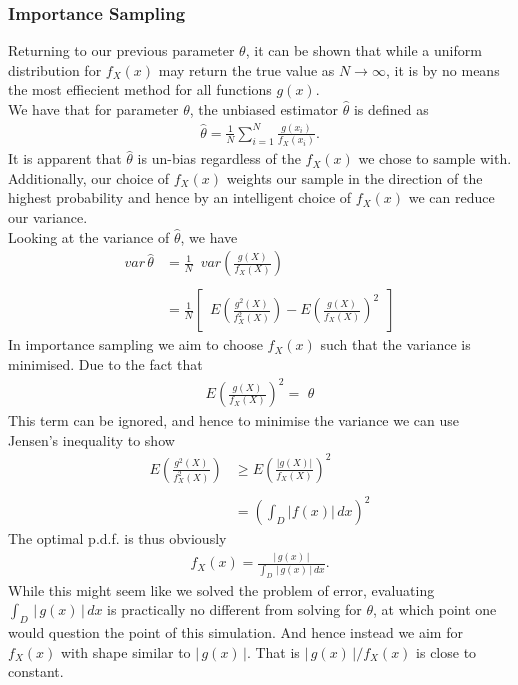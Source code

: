 \documentclass{article}
\begin{document}
\subsubsection{Importance Sampling}
Returning to our previous parameter $\theta$, it can be shown that while a uniform distribution for $f_{X}(x)$ may return the true value as $N\to \infty$, it is by no means the most effiecient method for all functions $g(x)$.
\\
We have that for parameter $\theta$, the unbiased estimator $\hat{\theta}$ is defined as 
\begin{align}
\hat{\theta}=\frac{1}{N}\sum_{i=1}^{N} \frac{g(x_{i})}{f_{X}(x_{i})}.
\end{align}
It is apparent that $\hat{\theta}$ is un-bias regardless of the $f_{X}(x)$ we chose to sample with. Additionally, our choice of $f_{X}(x)$ weights our sample in the direction of the highest probability and hence by an intelligent choice of $f_{X}(x)$ we can reduce our variance. 
\\
Looking at the variance of $\hat{\theta}$, we have
\begin{align}
var\,\hat{\theta} &= \frac{1}{N} \,\,\, var\left( \frac{g(X)}{f_{X}(X)} \right)\\
\\
&=\frac{1}{N} \left[ \,\,\, E \left( \frac{g^{2}(X)}{f_{X}^{2}(X)} \right) - E\left( \frac{g(X)}{f_{X}(X)} \right)^{2} \,\,\, \right]
\end{align}
In importance sampling we aim to choose $f_{X}(x)$ such that the variance is minimised.
Due to the fact that 
\begin{align}
E\left( \frac{g(X)}{f_{X}(X)} \right)^{2}  = \,\, \theta
\end{align}
This term can be ignored, and hence to minimise the variance we can use Jensen's inequality to show 
\begin{align}
E\left( \frac{g^{2}(X)}{f_{X}^{2}(X)} \right) &\geq E\left( \frac{|g(X)|}{f_{X}(X)} \right)^{2} \\
\\
&=\left( \int_{D} |f(x)|\,dx \right)^{2}
\end{align} 
The optimal p.d.f. is thus obviously 
\begin{align}
f_{X}(x) = \frac{|\,g(x)\,|}{\int_{D}\,|\,g(x)\,|\,dx}.
\end{align}
While this might seem like we solved the problem of error, evaluating $\int_{D}\,|\,g(x)\,|\,dx$ is practically no different from solving for $\theta$, at which point one would question the point of this simulation. And hence instead we aim for $f_{X}(x)$ with shape similar to $|\,g(x)\,|$. That is $|\,g(x)\,|/f_{X}(x)$ is close to constant. \cite{gentle2003random}




 
\end{document}
